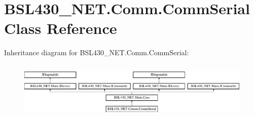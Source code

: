 \hypertarget{class_b_s_l430___n_e_t_1_1_comm_1_1_comm_serial}{}\section{B\+S\+L430\+\_\+\+N\+E\+T.\+Comm.\+Comm\+Serial Class Reference}
\label{class_b_s_l430___n_e_t_1_1_comm_1_1_comm_serial}
Inheritance diagram for B\+S\+L430\+\_\+\+N\+E\+T.\+Comm.\+Comm\+Serial\+:\begin{figure}[H]
\begin{center}
\leavevmode
\includegraphics[height=2.745098cm]{class_b_s_l430___n_e_t_1_1_comm_1_1_comm_serial}
\end{center}
\end{figure}
